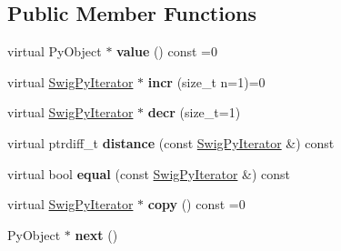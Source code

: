 \subsection*{Public Member Functions}
\begin{DoxyCompactItemize}
\item 
\hypertarget{structswig_1_1_swig_py_iterator_a7ba184c8ea37f53dbd75b6678a23f20c}{virtual Py\-Object $\ast$ {\bfseries value} () const =0}\label{structswig_1_1_swig_py_iterator_a7ba184c8ea37f53dbd75b6678a23f20c}

\item 
\hypertarget{structswig_1_1_swig_py_iterator_a8881170ecd7d9e674ef37eb16b2c9a7a}{virtual \hyperlink{structswig_1_1_swig_py_iterator}{Swig\-Py\-Iterator} $\ast$ {\bfseries incr} (size\-\_\-t n=1)=0}\label{structswig_1_1_swig_py_iterator_a8881170ecd7d9e674ef37eb16b2c9a7a}

\item 
\hypertarget{structswig_1_1_swig_py_iterator_aad0c74a8c95526184fefb897476320ef}{virtual \hyperlink{structswig_1_1_swig_py_iterator}{Swig\-Py\-Iterator} $\ast$ {\bfseries decr} (size\-\_\-t=1)}\label{structswig_1_1_swig_py_iterator_aad0c74a8c95526184fefb897476320ef}

\item 
\hypertarget{structswig_1_1_swig_py_iterator_a3895494d9405d978108028b06a4d682c}{virtual ptrdiff\-\_\-t {\bfseries distance} (const \hyperlink{structswig_1_1_swig_py_iterator}{Swig\-Py\-Iterator} \&) const }\label{structswig_1_1_swig_py_iterator_a3895494d9405d978108028b06a4d682c}

\item 
\hypertarget{structswig_1_1_swig_py_iterator_a08a5d7d7ff7a54dd062bcaec170be5a3}{virtual bool {\bfseries equal} (const \hyperlink{structswig_1_1_swig_py_iterator}{Swig\-Py\-Iterator} \&) const }\label{structswig_1_1_swig_py_iterator_a08a5d7d7ff7a54dd062bcaec170be5a3}

\item 
\hypertarget{structswig_1_1_swig_py_iterator_ae74c4b06f59975d9df19b30780cdefc1}{virtual \hyperlink{structswig_1_1_swig_py_iterator}{Swig\-Py\-Iterator} $\ast$ {\bfseries copy} () const =0}\label{structswig_1_1_swig_py_iterator_ae74c4b06f59975d9df19b30780cdefc1}

\item 
\hypertarget{structswig_1_1_swig_py_iterator_aafe564ca6084dccf9e98425363c8f9fc}{Py\-Object $\ast$ {\bfseries next} ()}\label{structswig_1_1_swig_py_iterator_aafe564ca6084dccf9e98425363c8f9fc}


\end{DoxyCompactItemize}
